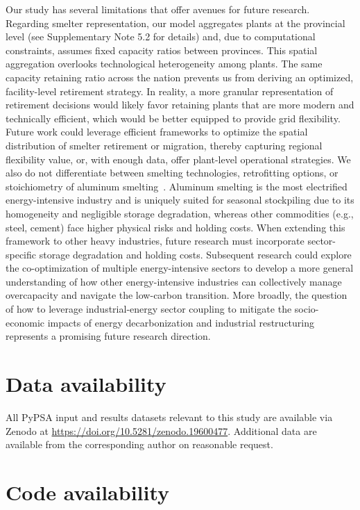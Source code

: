 \documentclass[preprint]{elsarticle}
\begin{document}
Our study has several limitations that offer avenues for future research. Regarding smelter representation, our model aggregates plants at the provincial level (see Supplementary Note 5.2 for details) and, due to computational constraints, assumes fixed capacity ratios between provinces. This spatial aggregation overlooks technological heterogeneity among plants. The same capacity retaining ratio across the nation prevents us from deriving an optimized, facility-level retirement strategy. In reality, a more granular representation of retirement decisions would likely favor retaining plants that are more modern and technically efficient, which would be better equipped to provide grid flexibility. Future work could leverage efficient frameworks to optimize the spatial distribution of smelter retirement or migration, thereby capturing regional flexibility value, or, with enough data, offer plant-level operational strategies. We also do not differentiate between smelting technologies, retrofitting options, or stoichiometry of aluminum smelting~\citep{shen_technologies_2024, tan_different_2025}. Aluminum smelting is the most electrified energy-intensive industry and is uniquely suited for seasonal stockpiling due to its homogeneity and negligible storage degradation, whereas other commodities (e.g., steel, cement) face higher physical risks and holding costs. When extending this framework to other heavy industries, future research must incorporate sector-specific storage degradation and holding costs. Subsequent research could explore the co-optimization of multiple energy-intensive sectors to develop a more general understanding of how other energy-intensive industries can collectively manage overcapacity and navigate the low-carbon transition. More broadly, the question of how to leverage industrial-energy sector coupling to mitigate the socio-economic impacts of energy decarbonization and industrial restructuring represents a promising future research direction.

\section*{Data availability}

All PyPSA input and results datasets relevant to this study are available via Zenodo at \url{https://doi.org/10.5281/zenodo.19600477}\citep{lyu2026industrial_overcapacity_supplementary}. Additional data are available from the corresponding author on reasonable request.


\section*{Code availability}
\end{document}
